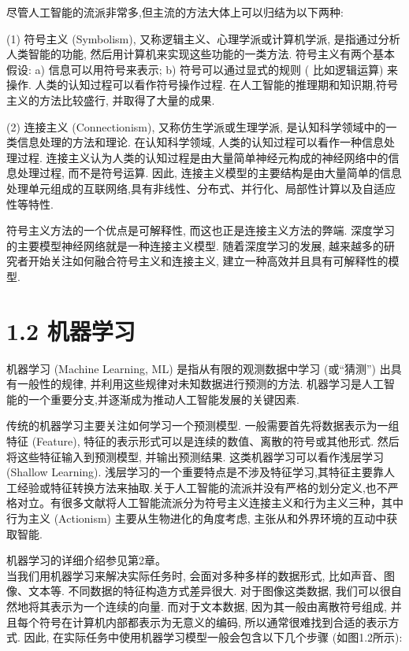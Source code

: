 \documentclass[10pt]{article}
\begin{document}
尽管人工智能的流派非常多,但主流的方法大体上可以归结为以下两种:

(1) 符号主义 (Symbolism), 又称逻辑主义、心理学派或计算机学派, 是指通过分析人类智能的功能, 然后用计算机来实现这些功能的一类方法. 符号主义有两个基本假设: a) 信息可以用符号来表示; b) 符号可以通过显式的规则 ( 比如逻辑运算) 来操作. 人类的认知过程可以看作符号操作过程. 在人工智能的推理期和知识期,符号主义的方法比较盛行, 并取得了大量的成果.

(2) 连接主义 (Connectionism), 又称仿生学派或生理学派, 是认知科学领域中的一类信息处理的方法和理论. 在认知科学领域, 人类的认知过程可以看作一种信息处理过程. 连接主义认为人类的认知过程是由大量简单神经元构成的神经网络中的信息处理过程, 而不是符号运算. 因此, 连接主义模型的主要结构是由大量简单的信息处理单元组成的互联网络,具有非线性、分布式、并行化、局部性计算以及自适应性等特性.

符号主义方法的一个优点是可解释性, 而这也正是连接主义方法的弊端. 深度学习的主要模型神经网络就是一种连接主义模型. 随着深度学习的发展, 越来越多的研究者开始关注如何融合符号主义和连接主义, 建立一种高效并且具有可解释性的模型.

\section*{1.2 机器学习}
机器学习 (Machine Learning, ML) 是指从有限的观测数据中学习 (或“猜测”) 出具有一般性的规律, 并利用这些规律对未知数据进行预测的方法. 机器学习是人工智能的一个重要分支,并逐渐成为推动人工智能发展的关键因素.

传统的机器学习主要关注如何学习一个预测模型. 一般需要首先将数据表示为一组特征 (Feature), 特征的表示形式可以是连续的数值、离散的符号或其他形式. 然后将这些特征输入到预测模型, 并输出预测结果. 这类机器学习可以看作浅层学习 (Shallow Learning). 浅层学习的一个重要特点是不涉及特征学习,其特征主要靠人工经验或特征转换方法来抽取.关于人工智能的流派并没有严格的划分定义,也不严格对立。有很多文献将人工智能流派分为符号主义连接主义和行为主义三种，其中行为主义 (Actionism) 主要从生物进化的角度考虑, 主张从和外界环境的互动中获取智能.

机器学习的详细介绍参见第2章。\\
当我们用机器学习来解决实际任务时, 会面对多种多样的数据形式, 比如声音、图像、文本等. 不同数据的特征构造方式差异很大. 对于图像这类数据, 我们可以很自然地将其表示为一个连续的向量. 而对于文本数据, 因为其一般由离散符号组成, 并且每个符号在计算机内部都表示为无意义的编码, 所以通常很难找到合适的表示方式. 因此, 在实际任务中使用机器学习模型一般会包含以下几个步骤 (如图1.2所示):
\end{document}

